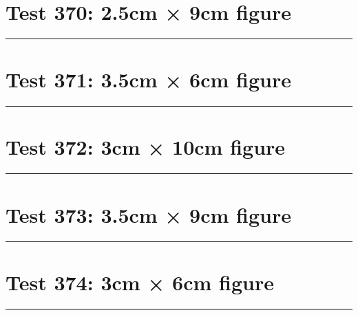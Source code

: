 \documentclass[a4paper,11pt]{article}
\begin{document}
\section*{Test 370: 2.5cm × 9cm figure}
\begin{swarmwrap}%
  \begin{minipage}[t]{2cm}
    \centering
    \rule{\linewidth}{9cm}
  \end{minipage}%
\end{swarmwrap}%
\swarmwrapnext
\lipsum[122]
\lipsum[123]
\lipsum[124]
\section*{Test 371: 3.5cm × 6cm figure}
\begin{swarmwrap}%
  \begin{minipage}[t]{3cm}
    \centering
    \rule{\linewidth}{6cm}
  \end{minipage}%
\end{swarmwrap}%
\swarmwrapnext
\lipsum[16]
\lipsum[17]
\lipsum[18]
\lipsum[19]
\lipsum[20]
\section*{Test 372: 3cm × 10cm figure}
\begin{swarmwrap}%
  \begin{minipage}[t]{3cm}
    \centering
    \rule{\linewidth}{10cm}
  \end{minipage}%
\end{swarmwrap}%
\swarmwrapnext
\lipsum[81]
\lipsum[82]
\lipsum[83]
\section*{Test 373: 3.5cm × 9cm figure}
\begin{swarmwrap}%
  \begin{minipage}[t]{3cm}
    \centering
    \rule{\linewidth}{9cm}
  \end{minipage}%
\end{swarmwrap}%
\swarmwrapnext
\lipsum[16]
\lipsum[17]
\lipsum[18]
\section*{Test 374: 3cm × 6cm figure}
\begin{swarmwrap}%
  \begin{minipage}[t]{3cm}
    \centering
    \rule{\linewidth}{6cm}
  \end{minipage}%
\end{swarmwrap}%
\swarmwrapnext
\lipsum[25]
\lipsum[26]
\lipsum[27]
\end{document}
